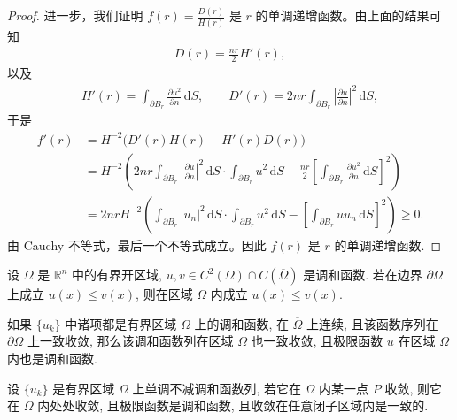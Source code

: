 \documentclass[../../main.tex]{subfiles}%
\begin{document}
\begin{proof}
进一步，我们证明 $f(r)=\frac{D(r)}{H(r)}$ 是 $r$ 的单调递增函数。由上面的结果可知
\begin{align*}
D(r) = \frac{nr}{2}H'(r),
\end{align*}
以及
\begin{align*}
H'(r) = \int_{\partial B_r}\frac{\partial u^2}{\partial n}\,\mathrm{d}S,\qquad D'(r)=2nr\int_{\partial B_r}\left|\frac{\partial u}{\partial n}\right|^2\,\mathrm{d}S,
\end{align*}
于是
\begin{align*}
f'(r) &= H^{-2}\big(D'(r)H(r) - H'(r)D(r)\big) \\
&= H^{-2}\left(2nr\int_{\partial B_r}\left|\frac{\partial u}{\partial n}\right|^2\,\mathrm{d}S \cdot \int_{\partial B_r}u^2\,\mathrm{d}S - \frac{nr}{2}\left[\int_{\partial B_r}\frac{\partial u^2}{\partial n}\,\mathrm{d}S\right]^2\right) \\
&= 2nrH^{-2}\left(\int_{\partial B_r}|u_n|^2\,\mathrm{d}S \cdot \int_{\partial B_r}u^2\,\mathrm{d}S - \left[\int_{\partial B_r}u u_n\,\mathrm{d}S\right]^2\right) 
\geqslant 0.
\end{align*}
由 Cauchy 不等式，最后一个不等式成立。因此 $f(r)$ 是 $r$ 的单调递增函数.
\end{proof}

\begin{theorem}[调和函数比较定理]
设 \(\Omega\) 是 \(\mathbb{R}^n\) 中的有界开区域, \(u, v \in C^2(\Omega) \cap C(\overline{\Omega})\) 是调和函数. 若在边界 \(\partial\Omega\) 上成立 \(u(x) \leqslant v(x)\), 则在区域 \(\Omega\) 内成立 \(u(x) \leqslant v(x)\).
\end{theorem}

\begin{theorem}[Harnack第一定理]
如果 $\{u_k\}$ 中诸项都是有界区域 $\Omega$ 上的调和函数, 在 $\overline{\Omega}$ 上连续, 且该函数序列在 $\partial\Omega$ 上一致收敛, 那么该调和函数列在区域 $\Omega$ 也一致收敛, 且极限函数 $u$ 在区域 $\Omega$ 内也是调和函数.
\end{theorem}

\begin{theorem}[Harnack第二定理]
设 $\{u_k\}$ 是有界区域 $\Omega$ 上单调不减调和函数列, 若它在 $\Omega$ 内某一点 $P$ 收敛, 则它在 $\Omega$ 内处处收敛, 且极限函数是调和函数, 且收敛在任意闭子区域内是一致的.
\end{theorem}
\end{document}
